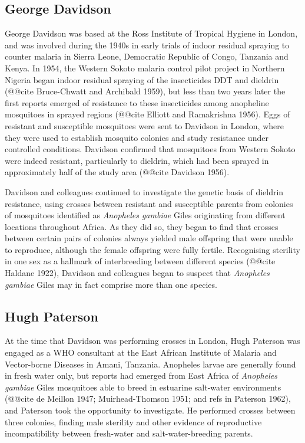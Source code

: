 \documentclass[a4paper,11pt,abstracton,hidelinks]{scrartcl}
\begin{document}
\subsection{George Davidson}

George Davidson was based at the Ross Institute of Tropical Hygiene in London, and was involved during the 1940s in early trials of indoor residual spraying to counter malaria in Sierra Leone, Democratic Republic of Congo, Tanzania and Kenya.
%
In 1954, the Western Sokoto malaria control pilot project in Northern Nigeria began indoor residual spraying of the insecticides DDT and dieldrin (@@cite Bruce-Chwatt and Archibald 1959), but less than two years later the first reports emerged of resistance to these insecticides among anopheline mosquitoes in sprayed regions (@@cite Elliott and Ramakrishna 1956).
%
Eggs of resistant and susceptible mosquitoes were sent to Davidson in London, where they were used to establish mosquito colonies and study resistance under controlled conditions.
%
Davidson confirmed that mosquitoes from Western Sokoto were indeed resistant, particularly to dieldrin, which had been sprayed in approximately half of the study area (@@cite Davidson 1956).

Davidson and colleagues continued to investigate the genetic basis of dieldrin resistance, using crosses between resistant and susceptible parents from colonies of mosquitoes identified as \textit{Anopheles gambiae} Giles originating from different locations throughout Africa.
%
As they did so, they began to find that crosses between certain pairs of colonies always yielded male offspring that were unable to reproduce, although the female offspring were fully fertile.
%
Recognising sterility in one sex as a hallmark of interbreeding between different species (@@cite Haldane 1922), Davidson and colleagues began to suspect that \textit{Anopheles gambiae} Giles may in fact comprise more than one species.


\subsection{Hugh Paterson}

At the time that Davidson was performing crosses in London, Hugh Paterson was engaged as a WHO consultant at the East African Institute of Malaria and Vector-borne Diseases in Amani, Tanzania.
%
Anopheles larvae are generally found in fresh water only, but reports had emerged from East Africa of \textit{Anopheles gambiae} Giles mosquitoes able to breed in estuarine salt-water environments (@@cite de Meillon 1947; Muirhead-Thomson 1951; and refs in Paterson 1962), and Paterson took the opportunity to investigate.
%
He performed crosses between three colonies, finding male sterility and other evidence of reproductive incompatibility between fresh-water and salt-water-breeding parents.
\end{document}
